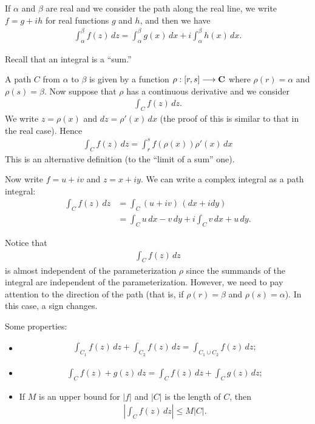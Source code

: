 \documentclass[11pt, oneside,margin=1in]{article}
\begin{document}
If $\alpha$ and $\beta$ are real and we consider the path along the real line, we write $f = g + ih$ for real functions $g$ and $h$, and then we have
\begin{align*}
	\int_{\alpha}^{\beta} f(z)  \, dz = \int_{\alpha}^{\beta} g(x)  \, dx + i \int_{\alpha}^{\beta} h(x)  \, dx.   
\end{align*}

Recall that an integral is a ``sum.''

A path $C$ from $\alpha$ to $\beta$ is given by a function $\rho :[r,s] \longrightarrow \mathbf C$ where $\rho(r)=\alpha$ and $\rho(s)= \beta$. Now suppose that $\rho$ has a continuous derivative and we consider 
\begin{align*}
	\int_{C}^{} f(z)  \, dz. 
\end{align*}
We write $z=\rho(x)$ and $dz = \rho'(x) \,dx$ (the proof of this is similar to that in the real case). Hence
\begin{align*}
	\int_{C}^{} f(z)  \, dz= \int_{r}^{s} f(\rho(x)) \rho'(x) \, dx  
\end{align*}
This is an alternative definition (to the ``limit of a sum'' one).

Now write $f=u+iv$ and $z=x+iy$. We can write a complex integral as a path integral:
 \begin{align*}
	 \int_{C}^{} f(z)  \, dz &= \int_{C}^{} (u+iv) \,(dx+idy) \\
				 &= \int_{C}^{} u  \, dx - v\,dy + i \int_{C}^{} v\,dx + u  \, dy.  
\end{align*}

Notice that
\begin{align*}
	\int_{C}^{} f(z)  \, dz 
\end{align*}
is almost independent of the parameterization $\rho$ since the summands of the integral are independent of the parameterization. However, we need to pay attention to the direction of the path (that is, if $\rho (r) = \beta$ and $\rho(s) = \alpha$). In this case, a sign changes.

Some properties:
\begin{itemize}
	\item \begin{align*}
		\int_{C_1}^{} f(z)  \, dz + \int_{C_2}^{} f(z)   \, dz = \int_{C_1\cup C_2}^{} f(z)  \, dz;   
	\end{align*}
\item \begin{align*}
	\int_{C}^{} f(z) +g(z) \, dz = \int_{C}^{} f(z)  \, dz + \int_{C}^{} g(z)  \, dz  ; 
\end{align*}
\item If $M$ is an upper bound for $\left\lvert f \right\rvert $ and $\left\lvert C \right\rvert $ is the length of $C$, then
	\begin{align*}
		\left\lvert \int_{C}^{} f(z)  \, dz  \right\rvert \le M\left\lvert C \right\rvert.
	\end{align*}
\end{itemize}
\end{document}
